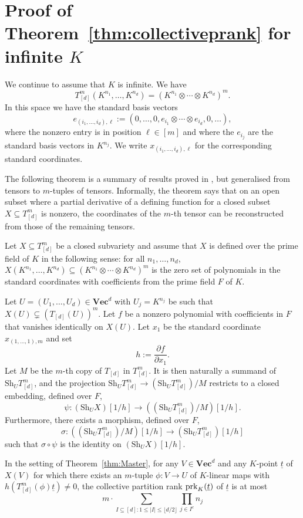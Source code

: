 \documentclass{amsart}
\renewcommand{\Vec}{\mathbf{Vec}}
\newcommand{\Sh}{\mathrm{Sh}}
\newcommand{\prk}{\textnormal{prk}}
\newcommand{\ul}[1]{\underline{#1}}
\newcommand{\floor}[1]{\lfloor #1 \rfloor}
\begin{document}
\section{Proof of Theorem~\ref{thm:collectiveprank} for infinite $K$}
\label{sec:Infinite}

We continue to assume that $K$ is infinite. We have 
\[ T_{[d]}^m (K^{n_1},\ldots,K^{n_d})=(K^{n_1} \otimes \cdots
\otimes K^{n_d})^m. \]
In this space we have the standard basis vectors 
\[ e_{(i_1,\ldots,i_d),\ell}
:=(0,\ldots,0,e_{i_1} \otimes \cdots \otimes e_{i_d},0,\ldots), \]
where the nonzero entry is in position $\ell \in [m]$ and where
the $e_{i_j}$ are the standard basis vectors in $K^{n_j}$. We write
$x_{(i_1,\ldots,i_d),\ell}$ for the corresponding standard coordinates.

The following theorem is a summary of results proved in \cite[\S
4]{Draisma18b}, but generalised from tensors to $m$-tuples of tensors.
Informally, the theorem says that on an open subset where a partial
derivative of a defining function for a closed subset $X \subseteq
T^m_{[d]}$ is nonzero, the coordinates of the $m$-th tensor can be
reconstructed from those of the remaining tensors. 

\begin{thm} \label{thm:Master}
Let $X \subseteq T_{[d]}^m$ be a closed subvariety and assume that $X$
is defined over the prime field of $K$ in the following sense: for all
$n_1,\ldots,n_d$, $X(K^{n_1},\ldots,K^{n_d}) \subseteq (K^{n_1} \otimes
\cdots \otimes K^{n_d})^m$ is the zero set of polynomials in the standard
coordinates with coefficients from the prime field $F$ of $K$.

Let $U=(U_1,\ldots,U_d) \in \Vec^d$ with $U_j=K^{n_j}$ be such that
$X(U) \subsetneq (T_{[d]}(U))^m$. Let $f$ be a nonzero polynomial with
coefficients in $F$ that vanishes identically on $X(U)$.  Let $x_1$
be the standard coordinate $x_{(1,\ldots,1),m}$ and set
\[ h:=\frac{\partial f}{\partial x_1}. \]
Let $M$ be the $m$-th copy of $T_{[d]}$ in $T_{[d]}^m$. It is then
naturally a summand of $\Sh_U T_{[d]}^m$, and the projection $\Sh_U
T_{[d]}^m \to (\Sh_U T_{[d]}^m)/M$ restricts to a closed embedding,
defined over $F$,
\[ \psi: (\Sh_U X)[1/h] \to ((\Sh_U T_{[d]}^m)/M)[1/h]. \]
Furthermore, there exists a morphism, defined over $F$,
\[ \sigma: ((\Sh_U T_{[d]}^m)/M)[1/h] \to (\Sh_U T_{[d]}^m)[1/h] \]
such that $\sigma \circ \psi$ is the identity on $(\Sh_U X)[1/h]$. 
\end{thm}


\begin{cor} \label{cor:Master}
In the setting of Theorem~\ref{thm:Master}, for any $V \in \Vec^d$ and
any $K$-point $\ul{t}$ of $X(V)$ for which there exists
an $m$-tuple $\phi:V \to U$ of 
$K$-linear maps with 
$h(T_{[d]}^m(\phi)\ul{t}) \neq 0$, the collective partition
rank $\prk_K(\ul{t})$ of $\ul{t}$ is at most 
\begin{equation}  \label{eq:HarderBound}
m\cdot \sum_{I \subseteq [d]: 1 \leq |I| \leq \floor{d/2}}
\prod_{j \in I^c} n_j  
\end{equation}
\end{cor}
\end{document}
